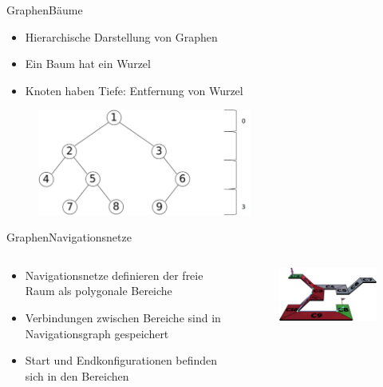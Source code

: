 \documentclass[t,aspectratio=169,dvipsnames]{beamer}
\begin{document}
\begin{frame}{Graphen}{Bäume}
	\begin{itemize}
		\item Hierarchische Darstellung von Graphen
		\item Ein Baum hat ein Wurzel
		\item Knoten haben Tiefe: Entfernung von Wurzel
	\end{itemize}
	
	\begin{figure}
		\includegraphics[width=7.0cm]{images/Bild5.png}
	\end{figure}
\end{frame}
\begin{frame}{Graphen}{Navigationsnetze}
	\begin{columns}
		\begin{column}[T]{0.5\textwidth}
			\begin{itemize}
				\item Navigationsnetze definieren der freie Raum als polygonale Bereiche
				\item Verbindungen zwischen Bereiche sind in Navigationsgraph gespeichert
				\item Start und Endkonfigurationen befinden sich in den Bereichen
			\end{itemize}
		\end{column}
		\begin{column}[T]{0.5\textwidth}
			\begin{figure}
				\includegraphics[width=6.5cm]{images/mesh_with_path.png}
			\end{figure}
		\end{column}
	\end{columns}
\end{frame}
\end{document}
